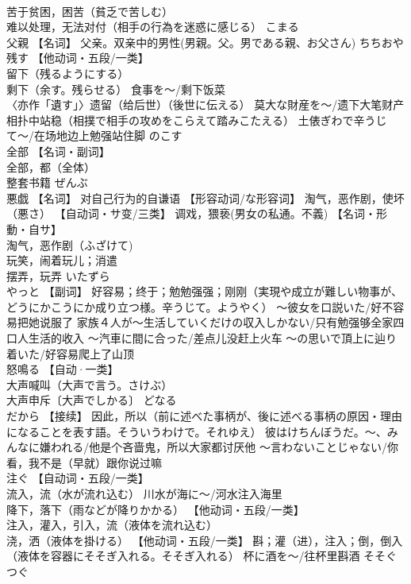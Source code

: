 \documentclass[8pt]{extreport}
\begin{document}
\begin{CJK}{UTF8}{min}
\\	苦于贫困，困苦（貧乏で苦しむ） 
\\	难以处理，无法对付（相手の行為を迷惑に感じる）	こまる	
\\	父親	【名词】 父亲。双亲中的男性(男親。父。男である親、お父さん)	ちちおや	
\\	残す	【他动词・五段/一类】 
\\	留下（残るようにする） 
\\	剩下（余す。残らせる） 食事を〜/剩下饭菜 
\\	〈亦作「遺す」〉遗留（给后世）（後世に伝える） 莫大な財産を〜/遗下大笔财产 
\\	相扑中站稳（相撲で相手の攻めをこらえて踏みこたえる） 土俵ぎわで辛うじて〜/在场地边上勉强站住脚	のこす	
\\	全部	【名词・副词】 
\\	全部，都（全体） 
\\	整套书籍	ぜんぶ	
\\	悪戯	【名词】 对自己行为的自谦语 【形容动词/な形容词】 淘气，恶作剧，使坏（悪さ） 【自动词・サ变/三类】 调戏，猥亵(男女の私通。不義) 【名词・形動・自サ】 
\\	淘气，恶作剧（ふざけて) 
\\	玩笑，闹着玩儿；消遣 
\\	摆弄，玩弄	いたずら	
\\	やっと	【副词】 好容易；终于；勉勉强强；刚刚（実現や成立が難しい物事が、どうにかこうにか成り立つ様。辛うじて。ようやく） ～彼女を口説いた/好不容易把她说服了 家族４人が～生活していくだけの収入しかない/只有勉强够全家四口人生活的收入 ～汽車に間に合った/差点儿没赶上火车 ～の思いで頂上に辿り着いた/好容易爬上了山顶		
\\	怒鳴る	【自动·一类】 
\\	大声喊叫（大声で言う。さけぶ） 
\\	大声申斥〔大声でしかる〕	どなる	
\\	だから	【接续】 因此，所以（前に述べた事柄が、後に述べる事柄の原因・理由になることを表す語。そういうわけで。それゆえ） 彼はけちんぼうだ。～、みんなに嫌われる/他是个吝啬鬼，所以大家都讨厌他 ～言わないことじゃない/你看，我不是（早就）跟你说过嘛		
\\	注ぐ	【自动词・五段/一类】 
\\	流入，流（水が流れ込む） 川水が海に～/河水注入海里 
\\	降下，落下（雨などが降りかかる） 【他动词・五段/一类】 
\\	注入，灌入，引入，流（液体を流れ込む） 
\\	浇，洒（液体を掛ける） 【他动词・五段/一类】 斟；灌（进），注入；倒，倒入（液体を容器にそそぎ入れる。そそぎ入れる） 杯に酒を～/往杯里斟酒	そそぐ つぐ	

\end{CJK}
\end{document}
